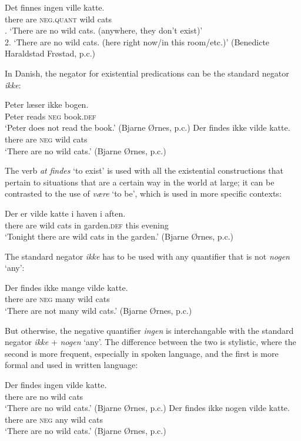 \documentclass[output=paper,colorlinks,citecolor=brown]{langscibook}
\begin{document}
\begin{paperappendix}
\begin{unindented}
\begin{exe}\ex\gll  Det   finnes ingen ville katte.\\
there are \textsc{neg.quant}  wild cats\\
. `There are no wild cats. (anywhere, they don't exist)’\\
2. `There are no wild cats. (here right now/in this room/etc.)' (Benedicte Haraldstad Frøstad, p.c.)
\end{exe}


In Danish, the negator for existential predications can be the standard negator \textit{ikke}:
%
\begin{exe}\ex \gll Peter læser ikke bogen. \\
Peter reads  \textsc{neg} book.\textsc{def} \\
    \glt `Peter does not read the book.' (Bjarne Ørnes, p.c.)
\ex \gll Der findes ikke vilde katte. \\
there are \textsc{neg} wild cats \\
    \glt `There are no wild cats.' (Bjarne Ørnes, p.c.)
    \end{exe}

The verb \textit{at} \textit{findes} `to exist' is used with all the existential constructions that pertain to situations that are a certain way in the world at large; it can be contrasted to the use of \textit{være} `to be', which is used in more specific contexts:
%
\begin{exe}\ex \gll Der er vilde katte i haven i aften. \\
there are wild cats in garden.\textsc{def} this evening \\
    \glt `Tonight there are wild cats in the garden.' (Bjarne Ørnes, p.c.)
    \end{exe}

The standard negator \textit{ikke} has to be used with any quantifier that is not \textit{nogen} `any':
%
\begin{exe}\ex \gll Der findes ikke mange vilde katte. \\
there are \textsc{neg}  many   wild cats \\
    \glt `There are not many wild cats.' (Bjarne Ørnes, p.c.)
    \end{exe}

But otherwise, the negative quantifier \textit{ingen} is interchangable with the standard negator \textit{ikke} + \textit{nogen} `any'. The difference between the two is stylistic, where the second is more frequent, especially in spoken language, and the first is more formal and used in written language:
%
\begin{exe}\ex \gll Der   findes ingen vilde katte. \\
there are no     wild cats \\
    \glt `There are no wild cats.' (Bjarne Ørnes, p.c.)
\ex \gll Der   findes ikke nogen vilde katte. \\
there are \textsc{neg}  any  wild cats \\
    \glt `There are no wild cats.' (Bjarne Ørnes, p.c.)
    \end{exe}


\end{unindented}
\end{paperappendix}
\end{document}

